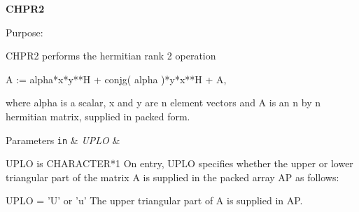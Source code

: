 {\bfseries C\+H\+P\+R2} 

\begin{DoxyParagraph}{Purpose\+: }
\begin{DoxyVerb} CHPR2  performs the hermitian rank 2 operation

    A := alpha*x*y**H + conjg( alpha )*y*x**H + A,

 where alpha is a scalar, x and y are n element vectors and A is an
 n by n hermitian matrix, supplied in packed form.\end{DoxyVerb}
 
\end{DoxyParagraph}

\begin{DoxyParams}[1]{Parameters}
\mbox{\tt in}  & {\em U\+P\+L\+O} & \begin{DoxyVerb}          UPLO is CHARACTER*1
           On entry, UPLO specifies whether the upper or lower
           triangular part of the matrix A is supplied in the packed
           array AP as follows:

              UPLO = 'U' or 'u'   The upper triangular part of A is
                                  supplied in AP.


\end{DoxyVerb}
\end{DoxyParams}
